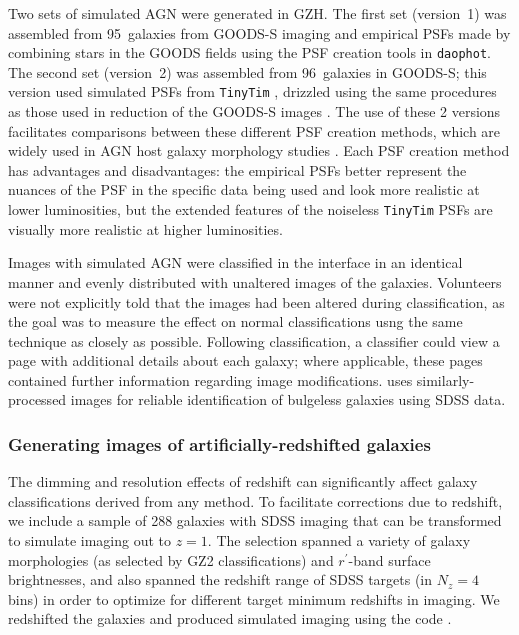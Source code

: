 \documentclass[twocolumn]{aastex6}
\begin{document}
Two sets of simulated AGN were generated in GZH. The first set (version~1) was
assembled from 95~galaxies from GOODS-S imaging and empirical PSFs made by
combining stars in the GOODS fields using the PSF creation tools in
\texttt{daophot}.  The second set (version~2) was assembled from 96~galaxies in
GOODS-S; this version used simulated PSFs from \texttt{TinyTim} \citep{kri93},
drizzled using the same procedures as those used in reduction of the GOODS-S
images \citep{koe02,koe03,gia04}. The use of these 2 versions facilitates
comparisons between these different PSF creation methods, which are widely used
in AGN host galaxy morphology studies
\citep[e.g.,][]{san04,sim08,pie10a,simm11}.  Each PSF creation method has
advantages and disadvantages: the empirical PSFs better represent the nuances
of the PSF in the specific data being used and look more realistic at lower
luminosities, but the extended features of the noiseless \texttt{TinyTim} PSFs
are visually more realistic at higher luminosities.

Images with simulated AGN were classified in the interface in an identical
manner and evenly distributed with unaltered images of the galaxies.
Volunteers were not explicitly told that the images had been altered during
classification, as the goal was to measure the effect on normal classifications
usng the same technique as closely as possible. Following classification, a
classifier could view a page with additional details about each galaxy; where
applicable, these pages contained further information regarding image
modifications. \citet{sim14} uses similarly-processed images for reliable
identification of bulgeless galaxies using SDSS data.


\subsubsection{Generating images of artificially-redshifted galaxies}\label{ssec:ferengi}

The dimming and resolution effects of redshift can significantly affect galaxy
classifications derived from any method. To facilitate corrections due to
redshift, we include a sample of 288 galaxies with SDSS imaging that can be
transformed to simulate \hst{} imaging out to $z = 1$. The selection spanned a
variety of galaxy morphologies (as selected by GZ2 classifications) and
$r^\prime$-band surface brightnesses, and also spanned the redshift range of
SDSS targets (in $N_z = 4$ bins) in order to optimize for different target
minimum redshifts in \hst{} imaging. We redshifted the galaxies and produced
simulated \hst{} imaging using the \ferengi{} code \citep{bar08a}.
\end{document}
